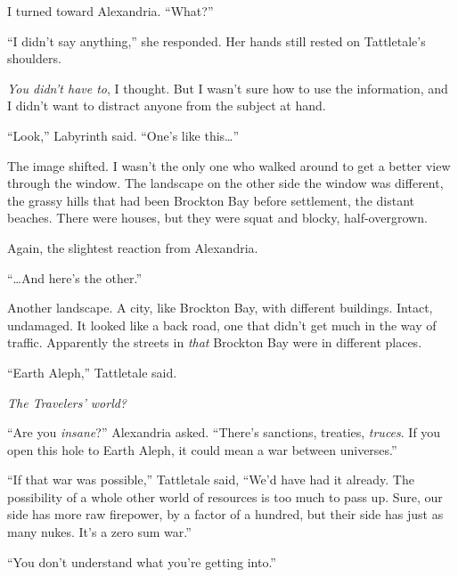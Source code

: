 I turned toward Alexandria.  ``What?''



``I didn't say anything,'' she responded.  Her hands still rested on Tattletale's shoulders.



\emph{You didn't have to}, I thought.  But I wasn't sure how to use the information, and I didn't want to distract anyone from the subject at hand.



``Look,'' Labyrinth said.  ``One's like this\ldots''



The image shifted.  I wasn't the only one who walked around to get a better view through the window.  The landscape on the other side the window was different, the grassy hills that had been Brockton Bay before settlement, the distant beaches.  There were houses, but they were squat and blocky, half-overgrown.



Again, the slightest reaction from Alexandria.



``\ldots{}And here's the other.''



Another landscape.  A city, like Brockton Bay, with different buildings.  Intact, undamaged.  It looked like a back road, one that didn't get much in the way of traffic.  Apparently the streets in \emph{that} Brockton Bay were in different places.



``Earth Aleph,'' Tattletale said.



\emph{The Travelers' world?}



``Are you \emph{insane}?'' Alexandria asked.  ``There's sanctions, treaties, \emph{truces}.  If you open this hole to Earth Aleph, it could mean a war between universes.''



``If that war was possible,'' Tattletale said, ``We'd have had it already.  The possibility of a whole other world of resources is too much to pass up.  Sure, our side has more raw firepower, by a factor of a hundred, but their side has just as many nukes.  It's a zero sum war.''



``You don't understand what you're getting into.''



